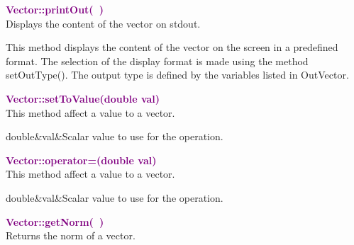 \textcolor{purple}{\textbf{Vector::printOut(~)}}\label{Vector::printOut()}\\
Displays the content of the vector on stdout.

This method displays the content of the vector on the screen in a predefined format.
The selection of the display format is made using the method setOutType().
The output type is defined by the variables listed in OutVector.

\textcolor{purple}{\textbf{Vector::setToValue(double val)}}\label{Vector::setToValue(double val)}\\
This method affect a value to a vector.

\begin{tcolorbox}[width=\textwidth,myArgs,tabularx={ll|R}]
double&val&Scalar value to use for the  operation.
\end{tcolorbox}


\textcolor{purple}{\textbf{Vector::operator=(double val)}}\label{Vector::operator=(double val)}\\
This method affect a value to a vector.

\begin{tcolorbox}[width=\textwidth,myArgs,tabularx={ll|R}]
double&val&Scalar value to use for the  operation.
\end{tcolorbox}


\textcolor{purple}{\textbf{Vector::getNorm(~)}}\label{Vector::getNorm()}\\
Returns the norm of a vector.

